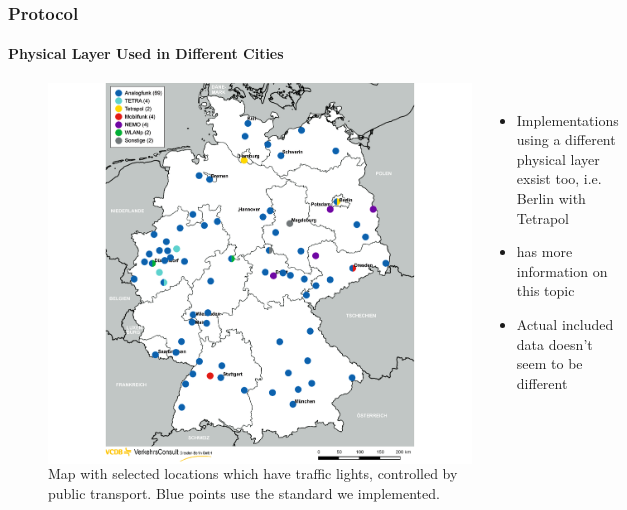 
\begin{frame}
\frametitle{Protocol}
\framesubtitle{Physical Layer Used in Different Cities}
\begin{figure}
\begin{columns}
\centering
\includegraphics[height=0.8\textheight]{figs/vcdb-map-ampelbeeinflussung.png}
\caption{Map with selected locations which have traffic lights, controlled by public transport. Blue points use the standard we implemented.}
\vspace{0.5cm}
\begin{itemize}
	\item Implementations using a different physical layer exsist too, i.e. Berlin with Tetrapol
	\item {} has more information on this topic
	\item Actual included data doesn't seem to be different
\end{itemize}
\end{columns}
\end{figure}
\end{frame}

